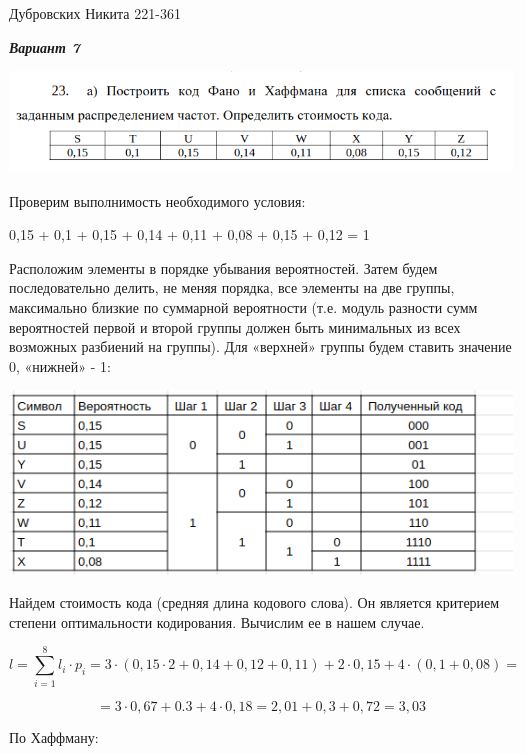 \documentclass[12pt]{article}
\begin{document}
Дубровских Никита 221-361

\textit{\textbf{Вариант 7}}

\includegraphics[scale=.5]{23.png}

Проверим выполнимость необходимого условия:

0,15 + 0,1 + 0,15 + 0,14 + 0,11 + 0,08 + 0,15 + 0,12 = 1

Расположим элементы в порядке убывания вероятностей. Затем будем
последовательно делить, не меняя порядка, все элементы на две группы,
максимально близкие по суммарной вероятности (т.е. модуль разности сумм
вероятностей первой и второй группы должен быть минимальных из всех
возможных разбиений на группы). Для «верхней» группы будем ставить
значение 0, «нижней» - 1:

\begin{center}
	\includegraphics[scale=.75]{23_2.png}
\end{center}

Найдем стоимость кода (средняя длина кодового слова). Он является
критерием степени оптимальности кодирования. Вычислим ее в нашем случае.

$$l=\sum_{i=1}^8l_i \cdot p_i = 3 \cdot (0,15 \cdot 2 + 0,14 + 0,12 + 0,11) + 2 \cdot 0,15 + 4 \cdot (0,1 + 0,08) = $$

$$=3 \cdot 0,67 + 0.3 + 4 \cdot 0,18 = 2,01 + 0,3 + 0,72 = 3,03$$

По Хаффману:
\end{document}
